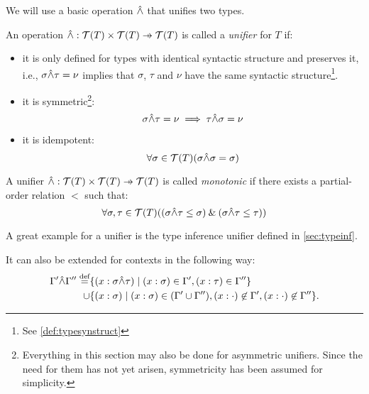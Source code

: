 \documentclass[main.tex]{subfiles}
\begin{document}
We will use a basic operation $\hat{\wedge}$ that unifies two types.

\begin{defn}
    An operation $ \unify : \tclos{T} \times \tclos{T} \pfun \tclos{T}$ is
    called a \emph{unifier} for $T$ if:
    \begin{itemize}
        \item it is only defined for types with identical syntactic structure and
            preserves it, i.e., $\sigma \hat{\wedge} \tau = \nu$ implies that $\sigma$,
            $\tau$ and $\nu$ have the same syntactic structure\footnote{
                See \cref{def:typesynstruct}
            }.

        \item it is symmetric\footnote{
                Everything in this section may also be done for asymmetric unifiers.
                Since the need for them has not yet arisen, symmetricity has been
                assumed for simplicity.
            }:
            \[ \sigma \hat{\wedge} \tau = \nu \implies \tau \hat{\wedge} \sigma = \nu \]

        \item it is idempotent:
            \[ \forall \sigma \in \mathcal{T}( T ) (\sigma \hat{\wedge} \sigma = \sigma) \]
    \end{itemize}
\end{defn}

\begin{defn}\label{def:mono}
    A unifier $ \unify : \tclos{T} \times \tclos{T} \pfun \tclos{T}$ is called
    \emph{monotonic} if there exists a partial-order relation $\less$ such that:
    \[ \forall \sigma, \tau \in \mathcal{T}( T )
        ((\sigma \hat{\wedge} \tau \leq \sigma) \mathbin{\&} (\sigma \hat{\wedge} \tau \leq \tau)) \]
\end{defn}

A great example for a unifier is the type inference unifier defined in
\cref{sec:typeinf}.


It can also be extended for contexts in the following way:
\[
    \begin{split}
        \Gamma' \hat{\wedge} \Gamma'' \overset{\text{\scriptsize def}}{=}
        &\{ (x : \sigma \hat{\wedge} \tau) \mid (x : \sigma) \in \Gamma', (x : \tau) \in \Gamma''\} \\
        \cup &
        \{ (x : \sigma) \mid (x : \sigma) \in (\Gamma' \cup \Gamma''),
            (x : \cdot) \not\in \Gamma',
            (x : \cdot) \not\in \Gamma'' \}. \\
    \end{split}
\]
\end{document}

